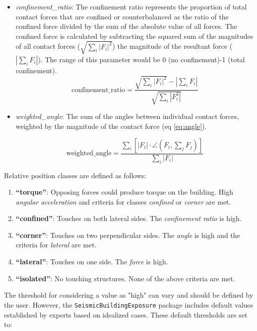 \begin{refsection}
\begin{itemize}
\item \textit{confinement\_ratio}: The confinement ratio represents the proportion of total contact forces that are confined or counterbalanced as the ratio of the confined force divided by the sum of the absolute value of all forces. The confined force is calculated by subtracting the squared sum of the magnitudes of all contact forces ($\sqrt{\sum_{i} |F_i|^2}$) the magnitude of the resultant force ($\left| \sum_{i} F_i \right|$). The range of this parameter would be 0 (no confinement)-1 (total confinement).
    \begin{equation}
        \label{eq:conf}
        \text{confinement\_ratio} = \frac{\sqrt{\sum_{i} \left| F_i \right|^2} - \left| \sum_{i} F_i \right|}{\sqrt{\sum_{i} \left| F_i^2 \right|} }
    \end{equation}

\item \textit{weighted\_angle}: The sum of the angles between individual contact forces, weighted by the magnitude of the contact force (eq \ref{eq:angle}).

\begin{equation}
    \label{eq:angle}
    \text{weighted\_angle} = \frac{\sum_{i}\left[ \left|F_i\right| \cdot \angle(F_i, \sum_{j} F_j)\right]}{\sum_{i}\left|F_i\right|}
\end{equation} 

\end{itemize}

Relative position classes are defined as follows:

\begin{enumerate}
    \item \textbf{“torque”}: Opposing forces could produce torque on the building. High \textit{angular acceleration} and criteria for classes \textit{confined} or \textit{corner} are met.
    \item \textbf{“confined”}: Touches on both lateral sides. The \textit{confinement ratio} is high.
    \item \textbf{“corner”}: Touches on two perpendicular sides. The \textit{angle} is high and the criteria for \textit{lateral} are met.
    \item \textbf{“lateral”}: Touches on one side. The \textit{force} is high.
    \item \textbf{“isolated”}: No touching structures. None of the above criteria are met.
\end{enumerate}

The threshold for considering a value as "high" can vary and should be defined by the user. However, the \texttt{SeismicBuildingExposure} package includes default values established by experts based on idealized cases. These default thresholds are set to:


\end{refsection}
